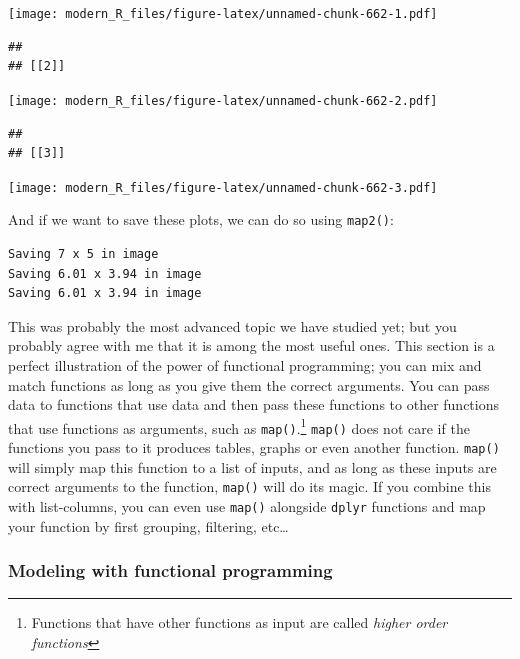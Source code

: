 \documentclass[]{gitbook}
\newenvironment{Shaded}{\begin{snugshade}}{\end{snugshade}}
\newcommand{\KeywordTok}[1]{\textcolor[rgb]{0.13,0.29,0.53}{\textbf{#1}}}
\newcommand{\NormalTok}[1]{#1}
\newcommand{\OperatorTok}[1]{\textcolor[rgb]{0.81,0.36,0.00}{\textbf{#1}}}
\newcommand{\StringTok}[1]{\textcolor[rgb]{0.31,0.60,0.02}{#1}}
\let\rmarkdownfootnote\footnote%
\def\footnote{\protect\rmarkdownfootnote}
\begin{document}
\texttt{[image: modern\_R\_files/figure-latex/unnamed-chunk-662-1.pdf]}

\begin{verbatim}
## 
## [[2]]
\end{verbatim}

\texttt{[image: modern\_R\_files/figure-latex/unnamed-chunk-662-2.pdf]}

\begin{verbatim}
## 
## [[3]]
\end{verbatim}

\texttt{[image: modern\_R\_files/figure-latex/unnamed-chunk-662-3.pdf]}

And if we want to save these plots, we can do so using \texttt{map2()}:

\begin{Shaded}
\end{Shaded}

\begin{verbatim}
Saving 7 x 5 in image
Saving 6.01 x 3.94 in image
Saving 6.01 x 3.94 in image
\end{verbatim}

This was probably the most advanced topic we have studied yet; but you probably agree with me that
it is among the most useful ones. This section is a perfect illustration of the power of functional
programming; you can mix and match functions as long as you give them the correct arguments.
You can pass data to functions that use data and then pass these functions to other functions that
use functions as arguments, such as \texttt{map()}.\footnote{Functions that have other functions as input are
  called \emph{higher order functions}} \texttt{map()} does not care if the functions you pass to it produces tables,
graphs or even another function. \texttt{map()} will simply map this function to a list of inputs, and as
long as these inputs are correct arguments to the function, \texttt{map()} will do its magic. If you
combine this with list-columns, you can even use \texttt{map()} alongside \texttt{dplyr} functions and map your
function by first grouping, filtering, etc\ldots{}

\hypertarget{modeling-with-functional-programming}{%
\subsubsection{Modeling with functional programming}\label{modeling-with-functional-programming}}
\end{document}
